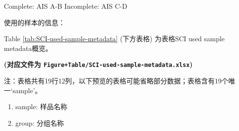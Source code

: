 \documentclass[
]{article}
\providecommand{\tightlist}{%
  \setlength{\itemsep}{0pt}\setlength{\parskip}{0pt}}
\begin{document}
Complete: AIS A-B
Incomplete: AIS C-D

使用的样本的信息：

Table \ref{tab:SCI-used-sample-metadata} (下方表格) 为表格SCI used sample metadata概览。

\textbf{(对应文件为 \texttt{Figure+Table/SCI-used-sample-metadata.xlsx})}

\begin{center}\begin{tcolorbox}[colback=gray!10, colframe=gray!50, width=0.9\linewidth, arc=1mm, boxrule=0.5pt]注：表格共有19行12列，以下预览的表格可能省略部分数据；表格含有19个唯一`sample'。
\end{tcolorbox}
\end{center}
\begin{center}\begin{tcolorbox}[colback=gray!10, colframe=gray!50, width=0.9\linewidth, arc=1mm, boxrule=0.5pt]\begin{enumerate}\tightlist
\item sample: 样品名称
\item group: 分组名称
\end{enumerate}\end{tcolorbox}
\end{center}
\end{document}
